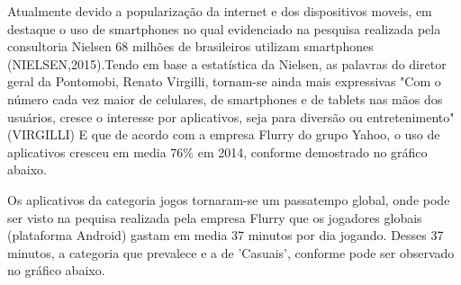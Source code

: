 Atualmente devido a popularização da internet e dos dispositivos moveis, em destaque o uso de smartphones no qual evidenciado na pesquisa realizada pela consultoria Nielsen 68 milhões de brasileiros utilizam smartphones (NIELSEN,2015).Tendo em base a estatística da Nielsen, as palavras do diretor geral da Pontomobi, Renato Virgilli, tornam-se ainda mais expressivas "Com o número cada vez maior de celulares, de smartphones e de tablets nas mãos dos usuários, cresce o interesse por aplicativos, seja para diversão ou entretenimento" (VIRGILLI)
E que de acordo com a empresa Flurry do grupo Yahoo, o uso de aplicativos cresceu em media 76\% em 2014, conforme demostrado no gráfico abaixo.\begin{figure}[h!]
		\centering
	\end{figure}
	
	
Os aplicativos da categoria jogos tornaram-se um passatempo global, onde pode ser visto na pequisa  realizada pela empresa Flurry que os jogadores globais (plataforma Android) gastam em media 37 minutos por dia jogando. Desses 37 minutos, a categoria que prevalece e a de 'Casuais', conforme pode ser observado no gráfico abaixo.\begin{figure}[h!]
		\centering
	\end{figure}
	
